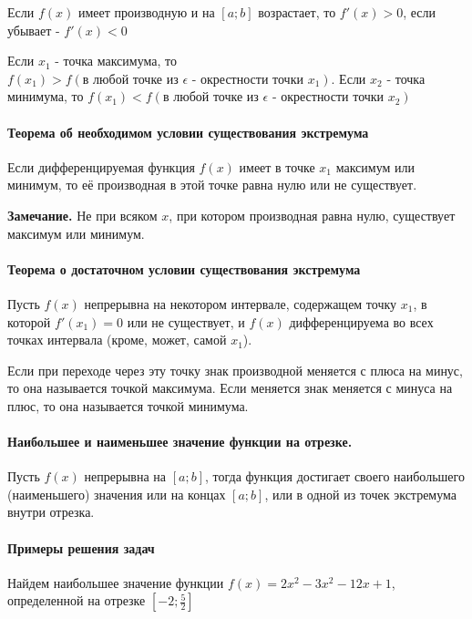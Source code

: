 \documentclass{article}
\begin{document}
\begin{flushleft}

Если $f(x)$ имеет производную и на $[a; b]$ возрастает, то $f'(x) > 0$, если убывает - $f'(x) < 0$

Если $x_1$ - точка максимума, то $f(x_1) > f(\text{в любой точке из } \epsilon \text{ - окрестности точки } x_1)$. Если $x_2$ - точка минимума, то $f(x_1) < f(\text{в любой точке из } \epsilon \text{ - окрестности точки } x_2)$

\paragraph{Теорема об необходимом условии существования экстремума}

Если дифференцируемая функция $f(x)$ имеет в точке $x_1$ максимум или минимум, то её производная в этой точке равна нулю или не существует.

\textbf{Замечание.} Не при всяком $x$, при котором производная равна нулю, существует максимум или минимум.

\paragraph{Теорема о достаточном условии существования экстремума} Пусть $f(x)$ непрерывна на некотором интервале, содержащем точку $x_1$, в которой $f'(x_1) = 0$ или не существует, и $f(x)$ дифференцируема во всех точках интервала (кроме, может, самой $x_1$).

Если при переходе через эту точку знак производной меняется с плюса на минус, то она называется точкой максимума. Если меняется знак меняется с минуса на плюс, то она называется точкой минимума.

\paragraph{Наибольшее и наименьшее значение функции на отрезке.}

Пусть $f(x)$ непрерывна на $[a; b]$, тогда функция достигает своего наибольшего (наименьшего) значения или на концах $[a; b]$, или в одной из точек экстремума внутри отрезка.

\paragraph{Примеры решения задач}

Найдем наибольшее значение функции $f(x) = 2x^2 - 3x^2 - 12x + 1$, определенной на отрезке $[ -2; \frac{5}{2}]$


\end{flushleft}
\end{document}
